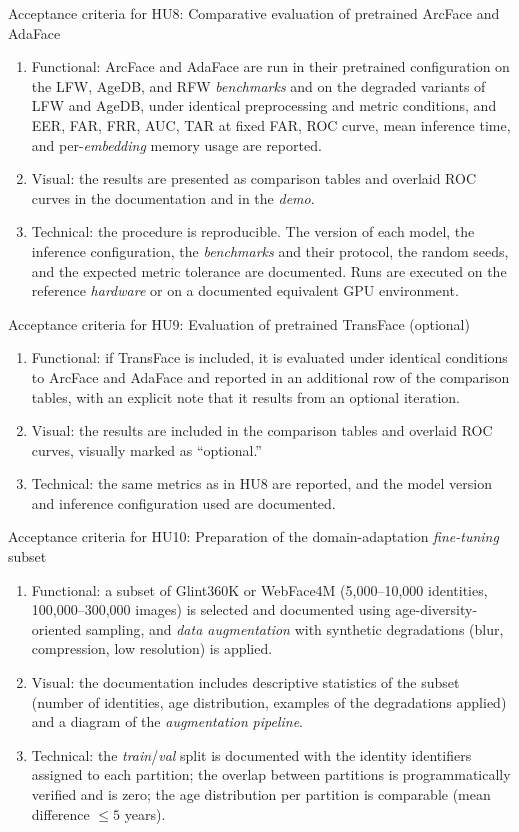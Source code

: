 \documentclass[
  11pt, %
]{charter}
\begin{document}
Acceptance criteria for HU8: Comparative evaluation of pretrained ArcFace and AdaFace
\begin{enumerate}
  \item Functional: ArcFace and AdaFace are run in their pretrained configuration on the LFW, AgeDB, and RFW \textit{benchmarks} and on the degraded variants of LFW and AgeDB, under identical preprocessing and metric conditions, and EER, FAR, FRR, AUC, TAR at fixed FAR, ROC curve, mean inference time, and per-\textit{embedding} memory usage are reported.
  \item Visual: the results are presented as comparison tables and overlaid ROC curves in the documentation and in the \textit{demo}.
  \item Technical: the procedure is reproducible. The version of each model, the inference configuration, the \textit{benchmarks} and their protocol, the random seeds, and the expected metric tolerance are documented. Runs are executed on the reference \textit{hardware} or on a documented equivalent GPU environment.
\end{enumerate}

Acceptance criteria for HU9: Evaluation of pretrained TransFace (optional)
\begin{enumerate}
  \item Functional: if TransFace is included, it is evaluated under identical conditions to ArcFace and AdaFace and reported in an additional row of the comparison tables, with an explicit note that it results from an optional iteration.
  \item Visual: the results are included in the comparison tables and overlaid ROC curves, visually marked as ``optional.''
  \item Technical: the same metrics as in HU8 are reported, and the model version and inference configuration used are documented.
\end{enumerate}

Acceptance criteria for HU10: Preparation of the domain-adaptation \textit{fine-tuning} subset
\begin{enumerate}
  \item Functional: a subset of Glint360K or WebFace4M (5,000--10,000 identities, 100,000--300,000 images) is selected and documented using age-diversity-oriented sampling, and \textit{data augmentation} with synthetic degradations (blur, compression, low resolution) is applied.
  \item Visual: the documentation includes descriptive statistics of the subset (number of identities, age distribution, examples of the degradations applied) and a diagram of the \textit{augmentation} \textit{pipeline}.
  \item Technical: the \textit{train}/\textit{val} split is documented with the identity identifiers assigned to each partition; the overlap between partitions is programmatically verified and is zero; the age distribution per partition is comparable (mean difference $\leq 5$ years).
\end{enumerate}
\end{document}
